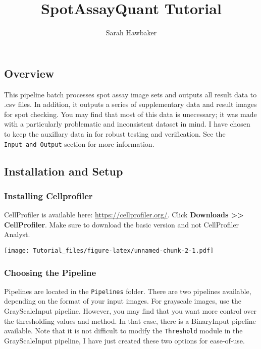 \documentclass[
]{article}
\title{SpotAssayQuant Tutorial}
\author{Sarah Hawbaker}
\date{}
\begin{document}
\maketitle

{
\setcounter{tocdepth}{2}
\tableofcontents
}
\hypertarget{overview}{%
\subsection{Overview}\label{overview}}

This pipeline batch processes spot assay image sets and outputs all
result data to .csv files. In addition, it outputs a series of
supplementary data and result images for spot checking. You may find
that most of this data is unecessary; it was made with a particularly
problematic and inconsistent dataset in mind. I have chosen to keep the
auxillary data in for robust testing and verification. See the
\texttt{Input\ and\ Output} section for more information.

\hypertarget{installation-and-setup}{%
\subsection{Installation and Setup}\label{installation-and-setup}}

\hypertarget{installation}{%
\subsubsection{Installing Cellprofiler}\label{installation}}

CellProfiler is available here: \url{https://cellprofiler.org/}. Click
\textbf{Downloads \textgreater\textgreater{} CellProfiler}. Make sure to
download the basic version and not CellProfiler Analyst.

\texttt{[image: Tutorial\_files/figure-latex/unnamed-chunk-2-1.pdf]}

\hypertarget{choosing}{%
\subsubsection{Choosing the Pipeline}\label{choosing}}

Pipelines are located in the \texttt{Pipelines} folder. There are two
pipelines available, depending on the format of your input images. For
grayscale images, use the GrayScaleInput pipeline. However, you may find
that you want more control over the thresholding values and method. In
that case, there is a BinaryInput pipeline available. Note that it is
not difficult to modify the \texttt{Threshold} module in the
GrayScaleInput pipeline, I have just created these two options for
ease-of-use.
\end{document}
